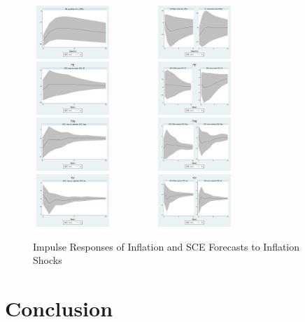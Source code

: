 \documentclass[]{article}
\begin{document}
\begin{figure}[ht]
	\centering
	\includegraphics[width=3cm,height=2cm]{figures/CPIAU_ashocks_nmpM.png}  
	\includegraphics[width=6cm,height=2cm]{figures/CPIAU_ashocksM.png} \\
	\smallskip
	\includegraphics[width=3cm,height=2cm]{figures/SCEFE_ashocks_nmpM.png} 
	\includegraphics[width=6cm,height=2cm]{figures/SCEFE_ashocksM.png} \\
	\smallskip
	\includegraphics[width=3cm,height=2cm]{figures/SCEDisg_ab_ashocks_nmpM.png} 
	\includegraphics[width=6cm,height=2cm]{figures/SCEDisg_ab_ashocksM.png} \\
	\smallskip 
	\includegraphics[width=3cm,height=2cm]{figures/SCEVar_ab_ashocks_nmpM.png} 
	\includegraphics[width=6cm,height=2cm]{figures/SCEVar_ab_ashocksM.png} 
	\caption{ Impulse Responses of Inflation and SCE Forecasts to Inflation Shocks}
	\label{SCE_IR}
\end{figure}

\section{Conclusion}




\end{document}

